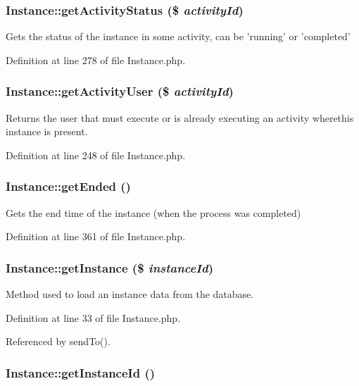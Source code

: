 \subsubsection{\setlength{\rightskip}{0pt plus 5cm}Instance::get\-Activity\-Status (\$ {\em activity\-Id})}\label{classInstance_a16}


Gets the status of the instance in some activity, can be 'running' or 'completed' 

Definition at line 278 of file Instance.php.
\subsubsection{\setlength{\rightskip}{0pt plus 5cm}Instance::get\-Activity\-User (\$ {\em activity\-Id})}\label{classInstance_a14}


Returns the user that must execute or is already executing an activity wherethis instance is present. 

Definition at line 248 of file Instance.php.
\subsubsection{\setlength{\rightskip}{0pt plus 5cm}Instance::get\-Ended ()}\label{classInstance_a22}


Gets the end time of the instance (when the process was completed) 

Definition at line 361 of file Instance.php.
\subsubsection{\setlength{\rightskip}{0pt plus 5cm}Instance::get\-Instance (\$ {\em instance\-Id})}\label{classInstance_a1}


Method used to load an instance data from the database. 

Definition at line 33 of file Instance.php.

Referenced by send\-To().
\subsubsection{\setlength{\rightskip}{0pt plus 5cm}Instance::get\-Instance\-Id ()}\label{classInstance_a9}


